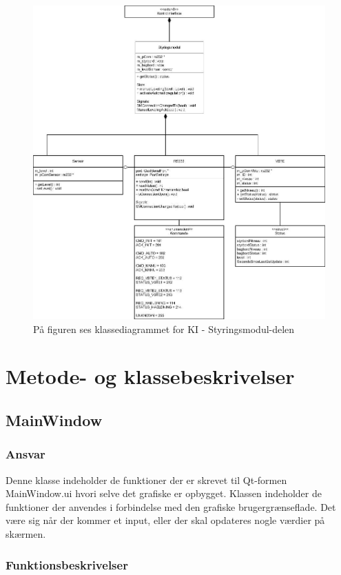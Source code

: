 \begin{figure}[H]
\centering
\includegraphics[width=1\textwidth]{billeder/SM-Class}
\caption{På figuren ses klassediagrammet for KI - Styringsmodul-delen}
\end{figure}

\section{Metode- og klassebeskrivelser}
\subsection{MainWindow}
\subsubsection{Ansvar}
Denne klasse indeholder de funktioner der er skrevet til Qt-formen MainWindow.ui hvori selve det grafiske er opbygget. Klassen indeholder de funktioner der anvendes i forbindelse med den grafiske brugergrænseflade. Det være sig når der kommer et input, eller der skal opdateres nogle værdier på skærmen.
\subsubsection{Funktionsbeskrivelser}
 
